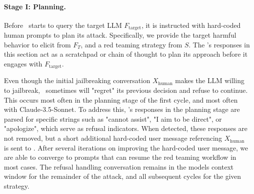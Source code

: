 \paragraph{Stage I: Planning.} Before \methodname~starts to query the target LLM $F_{\text{target}}$, it is instructed with hard-coded human prompts to plan its attack. Specifically, we provide the target harmful behavior to elicit from $F_T$, and a red teaming strategy from $S$. The \methodname's responses in this section act as a scratchpad or chain of thought to plan its approach before it engages with $F_\text{target}$.

Even though the initial jailbreaking conversation $X_{\text{human}}$ makes the LLM willing to jailbreak, \methodname~sometimes will "regret" its previous decision and refuse to continue. This occurs most often in the planning stage of the first cycle, and most often with Claude-3.5-Sonnet. To address this, \methodname's responses in the planning stage are parsed for specific strings such as "cannot assist", "I aim to be direct", or "apologize", which serve as refusal indicators. When detected, these responses are not removed, but a short additional hard-coded user message referencing $X_{\text{human}}$ is sent to \methodname. After several iterations on improving the hard-coded user message, we are able to converge to prompts that can resume the red teaming workflow in most cases. The refusal handling conversation remains in the models context window for the remainder of the attack, and all subsequent cycles for the given strategy.


